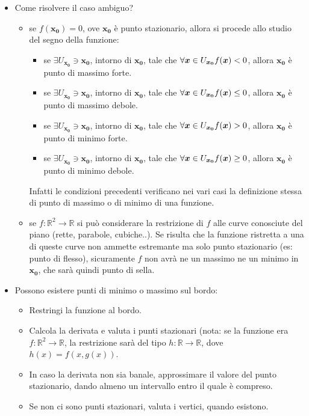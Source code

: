 \documentclass[a4paper,12pt]{article}
\begin{document}
\begin{itemize}
\begin{itemize}
\end{itemize}
\item Come risolvere il caso ambiguo?
\begin{itemize}
\item se $f(\boldsymbol {x_0})=0$, ove $\boldsymbol {x_0}$ è punto stazionario, allora si procede allo studio del segno della funzione:
\begin{itemize}
\item se $\exists U_{\boldsymbol {x_0}}\ni\boldsymbol {x_0}$, intorno di $\boldsymbol {x_0}$, tale che $\forall \boldsymbol{x}\in U_{\boldsymbol {x_0}}\\f(\boldsymbol{x})<0$, allora $\boldsymbol {x_0}$ è punto di massimo forte.
\item se $\exists U_{\boldsymbol {x_0}}\ni\boldsymbol {x_0}$, intorno di $\boldsymbol {x_0}$, tale che $\forall \boldsymbol{x}\in U_{\boldsymbol {x_0}}\\f(\boldsymbol{x})\leq0$, allora $\boldsymbol {x_0}$ è punto di massimo debole.
\item se $\exists U_{\boldsymbol {x_0}}\ni\boldsymbol {x_0}$, intorno di $\boldsymbol {x_0}$, tale che $\forall \boldsymbol{x}\in U_{\boldsymbol {x_0}}\\f(\boldsymbol{x})>0$, allora $\boldsymbol {x_0}$ è punto di minimo forte.
\item se $\exists U_{\boldsymbol {x_0}}\ni\boldsymbol {x_0}$, intorno di $\boldsymbol {x_0}$, tale che $\forall \boldsymbol{x}\in U_{\boldsymbol {x_0}}\\f(\boldsymbol{x})\geq0$, allora $\boldsymbol {x_0}$ è punto di minimo debole.
\end{itemize}
Infatti le condizioni precedenti verificano nei vari casi la definizione stessa di punto di massimo o di minimo di una funzione.
\item se $f:\mathbb{R}^2\to\mathbb{R}$ si può considerare la restrizione di $f$ alle curve conosciute del piano (rette, parabole, cubiche..). Se risulta che la funzione ristretta a una di queste curve non ammette estremante ma solo punto stazionario (es: punto di flesso), sicuramente $f$ non avrà ne un massimo ne un minimo in $\boldsymbol {x_0}$, che sarà quindi punto di sella.
\end{itemize}
\item Possono esistere punti di minimo o massimo sul bordo:
\begin{itemize}
 \item Restringi la funzione al bordo.
 \item Calcola la derivata e valuta i punti stazionari (nota: se la funzione era $f: \mathbb{R}^2 \rightarrow \mathbb{R}$, la restrizione sarà del tipo $h: \mathbb{R} \rightarrow \mathbb{R}$, dove $h(x) = f(x, g(x))$.
 \item In caso la derivata non sia banale, approssimare il valore del punto stazionario, dando almeno un intervallo entro il quale è compreso.
 \item Se non ci sono punti stazionari, valuta i vertici, quando esistono.
\end{itemize}
\end{itemize}
\end{document}
